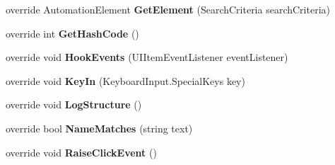 \begin{DoxyCompactItemize}
\item 
\hypertarget{class_proto_test_1_1_golem_1_1_white_1_1_elements_1_1_white_list_item_a1e8ac8e1d7cd6eb67399caaee4ee1821}{override Automation\-Element {\bfseries Get\-Element} (Search\-Criteria search\-Criteria)}\label{class_proto_test_1_1_golem_1_1_white_1_1_elements_1_1_white_list_item_a1e8ac8e1d7cd6eb67399caaee4ee1821}

\item 
\hypertarget{class_proto_test_1_1_golem_1_1_white_1_1_elements_1_1_white_list_item_a50b2b6acfc13b5bf8f68a284c4cdca96}{override int {\bfseries Get\-Hash\-Code} ()}\label{class_proto_test_1_1_golem_1_1_white_1_1_elements_1_1_white_list_item_a50b2b6acfc13b5bf8f68a284c4cdca96}

\item 
\hypertarget{class_proto_test_1_1_golem_1_1_white_1_1_elements_1_1_white_list_item_a243347c48c39b47e905b962b45d69c29}{override void {\bfseries Hook\-Events} (U\-I\-Item\-Event\-Listener event\-Listener)}\label{class_proto_test_1_1_golem_1_1_white_1_1_elements_1_1_white_list_item_a243347c48c39b47e905b962b45d69c29}

\item 
\hypertarget{class_proto_test_1_1_golem_1_1_white_1_1_elements_1_1_white_list_item_a10c4ac683d1d9a16291e9d96c0202428}{override void {\bfseries Key\-In} (Keyboard\-Input.\-Special\-Keys key)}\label{class_proto_test_1_1_golem_1_1_white_1_1_elements_1_1_white_list_item_a10c4ac683d1d9a16291e9d96c0202428}

\item 
\hypertarget{class_proto_test_1_1_golem_1_1_white_1_1_elements_1_1_white_list_item_a8108db6e22d0e44860cf0eae3131d713}{override void {\bfseries Log\-Structure} ()}\label{class_proto_test_1_1_golem_1_1_white_1_1_elements_1_1_white_list_item_a8108db6e22d0e44860cf0eae3131d713}

\item 
\hypertarget{class_proto_test_1_1_golem_1_1_white_1_1_elements_1_1_white_list_item_a2e8b8ae4a5734b7aa0a62ddc854d5d70}{override bool {\bfseries Name\-Matches} (string text)}\label{class_proto_test_1_1_golem_1_1_white_1_1_elements_1_1_white_list_item_a2e8b8ae4a5734b7aa0a62ddc854d5d70}

\item 
\hypertarget{class_proto_test_1_1_golem_1_1_white_1_1_elements_1_1_white_list_item_aa6daf5be125dd8d8329c7f9585d596b5}{override void {\bfseries Raise\-Click\-Event} ()}\label{class_proto_test_1_1_golem_1_1_white_1_1_elements_1_1_white_list_item_aa6daf5be125dd8d8329c7f9585d596b5}


\end{DoxyCompactItemize}
